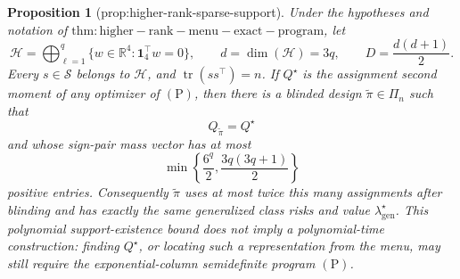 \documentclass{article}
\newtheorem{proposition}{Proposition}
\begin{document}
\begin{proposition}[prop:higher-rank-sparse-support]\label{prop:higher-rank-sparse-support}
Under the hypotheses and notation of \(\mathrm{thm:higher-rank-menu-exact-program}\), let
\[
\mathcal H=\bigoplus_{\ell=1}^q\{w\in\mathbb R^4:\mathbf 1_4^\top w=0\},
\qquad d=\dim(\mathcal H)=3q,
\qquad D=\frac{d(d+1)}2.
\]
Every \(s\in\mathscr S\) belongs to \(\mathcal H\), and \(\operatorname{tr}(ss^\top)=n\).  If \(Q^\star\) is the assignment second moment of any optimizer of \((\mathrm P)\), then there is a blinded design \(\widetilde\pi\in\Pi_n\) such that
\[
Q_{\widetilde\pi}=Q^\star
\]
and whose sign-pair mass vector has at most
\[
\min\left\{\frac{6^q}{2},\frac{3q(3q+1)}2\right\}
\]
positive entries.  Consequently \(\widetilde\pi\) uses at most twice this many assignments after blinding and has exactly the same generalized class risks and value \(\lambda_{\mathrm{gen}}^\star\).  This polynomial support-existence bound does not imply a polynomial-time construction: finding \(Q^\star\), or locating such a representation from the menu, may still require the exponential-column semidefinite program \((\mathrm P)\).
\end{proposition}
\end{document}
